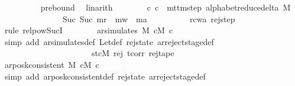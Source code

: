 \begin{isabellebody}
\ \ \ \ \ \ \ \ \isamarkupfalse%
\ pre{\isacharunderscore}{\kern0pt}bound\ \isamarkupfalse%
\ linarith\isanewline
\ \ \ \ \ \ \isamarkupfalse%
\ {\isachardoublequoteopen}{\isacharparenleft}{\kern0pt}c{\isacharprime}{\kern0pt}{\isacharcomma}{\kern0pt}\ c{\isacharprime}{\kern0pt}{\isacharprime}{\kern0pt}{\isacharparenright}{\kern0pt}\ {\isasymin}\ {\isacharparenleft}{\kern0pt}mttm{\isacharunderscore}{\kern0pt}step\ {\isacharparenleft}{\kern0pt}alphabet{\isacharunderscore}{\kern0pt}reduce{\isacharunderscore}{\kern0pt}delta\ M{\isacharparenright}{\kern0pt}{\isacharparenright}{\kern0pt}\isanewline
\ \ \ \ \ \ \ \ \ \ \ \ \ \ {\isacharcircum}{\kern0pt}{\isacharcircum}{\kern0pt}\ Suc\ {\isacharparenleft}{\kern0pt}Suc\ m{\isacharunderscore}{\kern0pt}r\ {\isacharplus}{\kern0pt}\ m{\isacharunderscore}{\kern0pt}w\ {\isacharplus}{\kern0pt}\ m{\isacharunderscore}{\kern0pt}a{\isacharparenright}{\kern0pt}{\isachardoublequoteclose}\isanewline
\ \ \ \ \ \ \ \ \isamarkupfalse%
\ rcwa\ rej{\isacharunderscore}{\kern0pt}step\ \isamarkupfalse%
\ {\isacharparenleft}{\kern0pt}rule\ relpow{\isacharunderscore}{\kern0pt}Suc{\isacharunderscore}{\kern0pt}I{\isacharparenright}{\kern0pt}\isanewline
\ \ \ \ \ \ \isamarkupfalse%
\ {\isachardoublequoteopen}ar{\isacharunderscore}{\kern0pt}simulates\ M\ cM{\isacharunderscore}{\kern0pt}{}\ c{\isacharprime}{\kern0pt}{\isacharprime}{\kern0pt}{\isachardoublequoteclose}\isanewline
\ \ \ \ \ \ \ \ \isamarkupfalse%
\ {\isacharparenleft}{\kern0pt}simp\ add{\isacharcolon}{\kern0pt}\ ar{\isacharunderscore}{\kern0pt}simulates{\isacharunderscore}{\kern0pt}def\ Let{\isacharunderscore}{\kern0pt}def\ rej{\isacharunderscore}{\kern0pt}state\ ar{\isacharunderscore}{\kern0pt}reject{\isacharunderscore}{\kern0pt}stage{\isacharunderscore}{\kern0pt}def\isanewline
\ \ \ \ \ \ \ \ \ \ \ \ \ \ \ \ \ \ \ \ \ \ st{\isacharunderscore}{\kern0pt}cM{}\ rej\ tcorr{\isacharunderscore}{\kern0pt}{}\ rej{\isacharunderscore}{\kern0pt}tape{\isacharparenright}{\kern0pt}\isanewline
\ \ \ \ \ \ \isamarkupfalse%
\ {\isachardoublequoteopen}ar{\isacharunderscore}{\kern0pt}posk{\isacharunderscore}{\kern0pt}consistent\ M\ cM{\isacharunderscore}{\kern0pt}{}\ c{\isacharprime}{\kern0pt}{\isacharprime}{\kern0pt}{\isachardoublequoteclose}\isanewline
\ \ \ \ \ \ \ \ \isamarkupfalse%
\ {\isacharparenleft}{\kern0pt}simp\ add{\isacharcolon}{\kern0pt}\ ar{\isacharunderscore}{\kern0pt}posk{\isacharunderscore}{\kern0pt}consistent{\isacharunderscore}{\kern0pt}def\ rej{\isacharunderscore}{\kern0pt}state\ ar{\isacharunderscore}{\kern0pt}reject{\isacharunderscore}{\kern0pt}stage{\isacharunderscore}{\kern0pt}def{\isacharparenright}{\kern0pt}\isanewline

\end{isabellebody}
